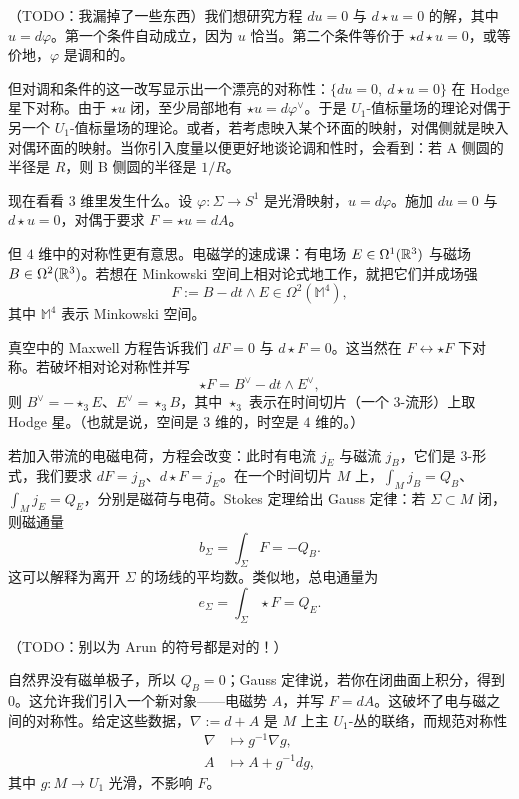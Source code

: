 （TODO：我漏掉了一些东西）我们想研究方程 $du = 0$ 与 $d\star u = 0$ 的解，其中 $u = d\varphi$。第一个条件自动成立，因为 $u$ 恰当。第二个条件等价于 $\star d\star u = 0$，或等价地，$\varphi$ 是调和的。

但对调和条件的这一改写显示出一个漂亮的对称性：$\{du = 0,\ d\star u = 0\}$ 在 Hodge 星下对称。由于 $\star u$ 闭，至少局部地有 $\star u = d\varphi^\vee$。于是 $U_1$-值标量场的理论对偶于另一个 $U_1$-值标量场的理论。或者，若考虑映入某个环面的映射，对偶侧就是映入对偶环面的映射。当你引入度量以便更好地谈论调和性时，会看到：若 A 侧圆的半径是 $R$，则 B 侧圆的半径是 $1/R$。

现在看看 $3$ 维里发生什么。设 $\varphi\colon\Sigma\to S^1$ 是光滑映射，$u = d\varphi$。施加 $du = 0$ 与 $d\star u = 0$，对偶于要求 $F = \star u = dA$。


但 $4$ 维中的对称性更有意思。电磁学的速成课：有电场 $E\in\Omega^1(\mathbb{R}^3)$ 与磁场 $B\in\Omega^2(\mathbb{R}^3)$。若想在 Minkowski 空间上相对论式地工作，就把它们并成场强
\[
  F := B - dt\wedge E\in\Omega^2(\mathbb{M}^4),
\]
其中 $\mathbb{M}^4$ 表示 Minkowski 空间。

真空中的 Maxwell 方程告诉我们 $dF = 0$ 与 $d\star F = 0$。这当然在 $F\leftrightarrow\star F$ 下对称。若破坏相对论对称性并写
\[
  \star F = B^\vee - dt\wedge E^\vee,
\]
则 $B^\vee = -\star_3 E$、$E^\vee = \star_3 B$，其中 $\star_3$ 表示在时间切片（一个 $3$-流形）上取 Hodge 星。（也就是说，空间是 $3$ 维的，时空是 $4$ 维的。）

若加入带流的电磁电荷，方程会改变：此时有电流 $j_E$ 与磁流 $j_B$，它们是 $3$-形式，我们要求 $dF = j_B$、$d\star F = j_E$。在一个时间切片 $M$ 上，$\int_M j_B = Q_B$、$\int_M j_E = Q_E$，分别是磁荷与电荷。Stokes 定理给出 Gauss 定律：若 $\Sigma\subset M$ 闭，则磁通量
\[
  b_\Sigma = \int_\Sigma F = -Q_B.
\]
这可以解释为离开 $\Sigma$ 的场线的平均数。类似地，总电通量为
\[
  e_\Sigma = \int_\Sigma \star F = Q_E.
\]

（TODO：别以为 Arun 的符号都是对的！）

自然界没有磁单极子，所以 $Q_B = 0$；Gauss 定律说，若你在闭曲面上积分，得到 $0$。这允许我们引入一个新对象——电磁势 $A$，并写 $F = dA$。这破坏了电与磁之间的对称性。给定这些数据，$\nabla := d + A$ 是 $M$ 上主 $U_1$-丛的联络，而规范对称性
\[
  \begin{aligned}
    \nabla &\longmapsto g^{-1}\nabla g,\\
    A &\longmapsto A + g^{-1}dg,
  \end{aligned}
\]
其中 $g\colon M\to U_1$ 光滑，不影响 $F$。

